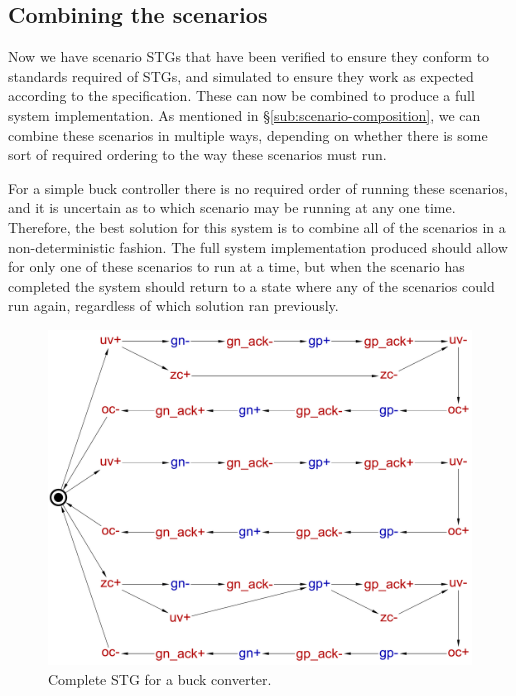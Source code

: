 \documentclass[british,compsoc]{IEEEtran}
\begin{document}

\subsection{Combining the scenarios }


Now we have scenario STGs that have been verified to ensure they conform
to standards required of STGs, and simulated to ensure they work as
expected according to the specification. These can now be combined
to produce a full system implementation. As mentioned in \S\ref{sub:scenario-composition},
we can combine these scenarios in multiple ways, depending on whether
there is some sort of required ordering to the way these scenarios
must run.

For a simple buck controller there is no required order of running
these scenarios, and it is uncertain as to which scenario may be running
at any one time. Therefore, the best solution for this system is to
combine all of the scenarios in a non-deterministic fashion. The full
system implementation produced should allow for only one of these
scenarios to run at a time, but when the scenario has completed the
system should return to a state where any of the scenarios could run
again, regardless of which solution ran previously.

\begin{figure}[t]
\begin{centering}
\includegraphics[scale=0.22]{Images/stg-buck-scenarios_merged}
\par\end{centering}

\begin{centering}
\protect\caption{\label{fig:buck STG}Complete STG for a buck converter.}

\par\end{centering}

\end{figure}
\end{document}
